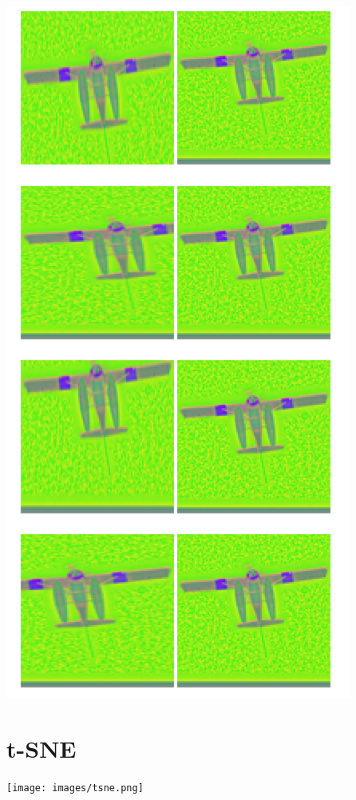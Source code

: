 \documentclass{article}
\begin{document}
\begin{centering}
\includegraphics[scale=0.5]{images/ImageDistortion.png}
\end{centering}

\section{t-SNE}
\begin{centering}
\texttt{[image: images/tsne.png]}
\end{centering}
\end{document}
